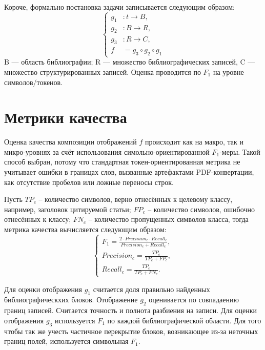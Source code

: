 Короче, формально постановка задачи записывается следующим образом:
$$
\begin{cases}
g_1 &: t \to B,\\
g_2 &: B \to R,\\
g_3 &: R \to C,\\
f   &= g_3 \circ g_2 \circ g_1
\end{cases}
$$
B — область библиографии; R — множество библиографических записей, C — множество структурированных записей. Оценка проводится по $F_1$ на уровне символов/токенов.

\section{Метрики качества}

Оценка качества композиции отображений $f$ происходит как на макро, так и микро-уровнях за счёт использования симольно-ориентированной $F_1$-меры. Такой способ выбран, потому что стандартная токен-ориентированная метрика не учитывает ошибки в границах слов, вызванные артефактами PDF-конвертации, как отсутствие пробелов или ложные переносы строк.

Пусть $TP_c$ -- количество символов, верно отнесённых к целевому классу, например, заголовок цитируемой статьи; $FP_c$ -- количество символов, ошибочно отнесённых к классу; $FN_c$ -- количество пропущенных символов класса, тогда метрика качества вычисляется следующим образом:
$$
\begin{cases}
F_1 = \frac{2\cdot Precision_c\cdot Recall_c}{Precision_c + Recall_c}, \\
Precision_c=\frac{TP_c}{TP_c+FP_c}, \\
Recall_c = \frac{TP_c}{TP_c + FN_c}.
\end{cases}
$$

Для оценки отображения $g_1$ считается доля правильно найденных библиографическхих блоков. Отображение $g_2$ оценивается по совпадаению границ записей. Считается точность и полнота разбиения на записи. Для оценки отображения $g_3$ используется $F_1$ по каждой библиографической области. Для того чтобы так же учесть частичное перекрытие блоков, возникающее из-за неточных границ полей, используется символьная $F_1$.